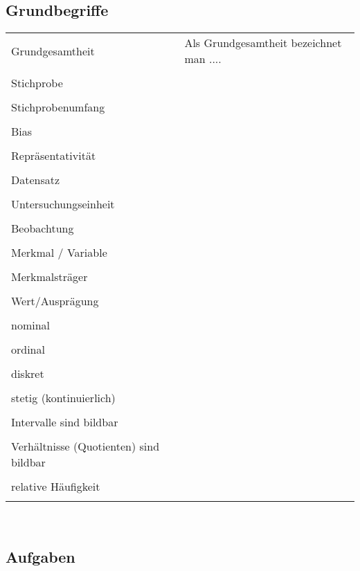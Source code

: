 \subsection{Grundbegriffe}

\begin{tabular}{p{5cm}|l}
  Grundgesamtheit         &  Als Grundgesamtheit bezeichnet man ....\\
  \\
  Stichprobe\index{Stichprobe}              & \\
  \\
  Stichprobenumfang       & \\
  \\
  Bias\index{Bias}                   & \\
  \\ 
  Repräsentativität       & \\
  \\
  Datensatz\index{Datensatz}               & \\
  \\
  Untersuchungseinheit\index{Untersuchungseinheit}    & \\
  \\
  Beobachtung             & \\
  \\
  Merkmal\index{Merkmal} / Variable      & \\
  \\
  Merkmalsträger\index{Merkmalsträger}          & \\
  \\
  Wert/Ausprägung         & \\
  \\
  nominal\index{nominal}                 & \\
  \\
  ordinal\index{ordinal}                 & \\
  \\
  diskret\index{diskret}                 & \\
  \\
  stetig (kontinuierlich) & \\
  \\
  Intervalle\index{Intervalle} sind bildbar & \\
  \\
  Verhältnisse\index{Verhältnisse!bildbar} (Quotienten) sind bildbar & \\
  \\
  relative Häufigkeit\index{Häufigkeit!relative}     & \\
  \\
\end{tabular}\\

\subsection*{Aufgaben}

